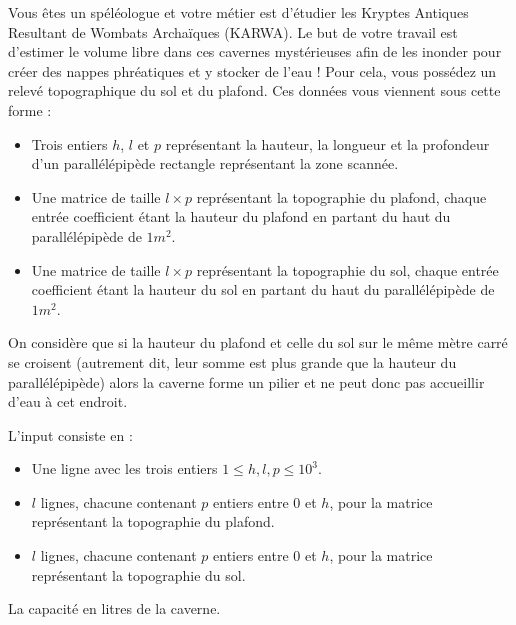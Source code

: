 

Vous êtes un spéléologue et votre métier est d'étudier les Kryptes Antiques Resultant de Wombats Archaïques (KARWA). Le but de votre travail est d'estimer le volume libre dans ces cavernes mystérieuses afin de les inonder pour créer des nappes phréatiques et y stocker de l'eau ! Pour cela, vous possédez un relevé topographique du sol et du plafond. Ces données vous viennent sous cette forme :
\begin{itemize}
\item Trois entiers $h$, $l$ et $p$ représentant la hauteur, la longueur et la profondeur d'un parallélépipède rectangle représentant la zone scannée.
\item Une matrice de taille $l\times p$ représentant la topographie du plafond, chaque entrée coefficient étant la hauteur du plafond en partant du haut du parallélépipède de $1m^2$.
\item Une matrice de taille $l\times p$ représentant la topographie du sol, chaque entrée coefficient étant la hauteur du sol en partant du haut du parallélépipède de $1m^2$.
\end{itemize}

On considère que si la hauteur du plafond et celle du sol sur le même mètre carré se croisent (autrement dit, leur somme est plus grande que la hauteur du parallélépipède) alors la caverne forme un pilier et ne peut donc pas accueillir d'eau à cet endroit.

\begin{Input}
    L'input consiste en :
    \begin{itemize}
        \item Une ligne avec les trois entiers $1 \leq h, l, p \leq 10^3$.
        \item $l$ lignes, chacune contenant $p$ entiers entre $0$ et $h$, pour la matrice représentant la topographie du plafond.
        \item $l$ lignes, chacune contenant $p$ entiers entre $0$ et $h$, pour la matrice représentant la topographie du sol.
    \end{itemize}
\end{Input}

\begin{Output}
    La capacité en litres de la caverne.
\end{Output}
